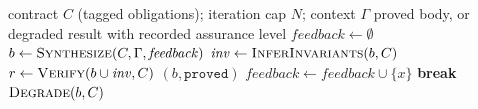 \begin{algorithm}[t]
\caption{The synthesis--verification loop for a single method.}
\label{alg:synthloop}
\begin{algorithmic}[1]
\REQUIRE contract $C$ (tagged obligations); iteration cap $N$; context $\Gamma$
\ENSURE proved body, or degraded result with recorded assurance level
\STATE $\mathit{feedback} \gets \emptyset$
  \STATE $b \gets \textsc{Synthesize}(C, \Gamma, \mathit{feedback})$ 
  \STATE $\mathit{inv} \gets \textsc{InferInvariants}(b, C)$ 
  \STATE $r \gets \textsc{Verify}(b \cup \mathit{inv}, C)$ 
    \RETURN $(b, \mathtt{proved})$
    \STATE $\mathit{feedback} \gets \mathit{feedback} \cup \{x\}$ 
  \ELSE
    \STATE \textbf{break} 
  \ENDIF
\ENDFOR
\RETURN $\textsc{Degrade}(b, C)$ 
\end{algorithmic}
\end{algorithm}

